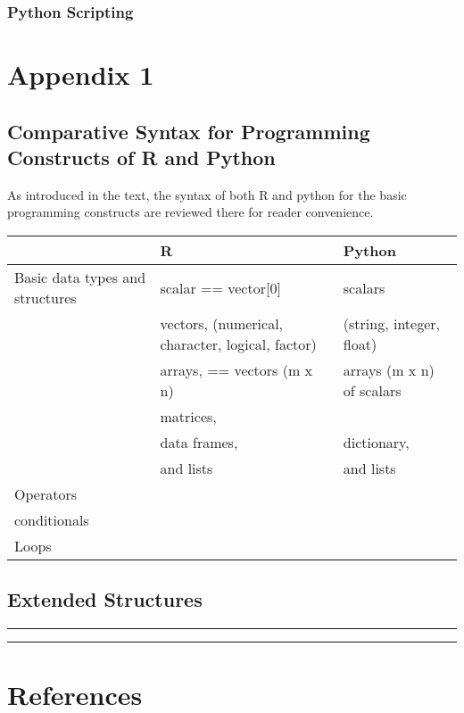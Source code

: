 \documentclass[]{book}
\theoremstyle{definition}
\theoremstyle{definition}
\theoremstyle{definition}
\theoremstyle{remark}
\begin{document}
\subsection{Python Scripting}\label{python-scripting-13}

\chapter{Appendix 1}\label{appendix-1}

\section{Comparative Syntax for Programming Constructs of R and
Python}\label{comparative-syntax-for-programming-constructs-of-r-and-python}

As introduced in the text, the syntax of both R and python for the basic
programming constructs are reviewed there for reader convenience.

\begin{longtable}[]{@{}lll@{}}
\toprule
& R & Python\tabularnewline
\midrule
\endhead
Basic data types and structures & scalar == vector{[}0{]} &
scalars\tabularnewline
& vectors, (numerical, character, logical, factor) & (string, integer,
float)\tabularnewline
& arrays, == vectors (m x n) & arrays (m x n) of scalars\tabularnewline
& matrices, &\tabularnewline
& data frames, & dictionary,\tabularnewline
& and lists & and lists\tabularnewline
Operators & &\tabularnewline
conditionals & &\tabularnewline
Loops & &\tabularnewline
\bottomrule
\end{longtable}

\section{Extended Structures}\label{extended-structures}

\begin{center}\rule{0.5\linewidth}{\linethickness}\end{center}

\begin{center}\rule{0.5\linewidth}{\linethickness}\end{center}

\chapter{References}\label{references}
\end{document}
